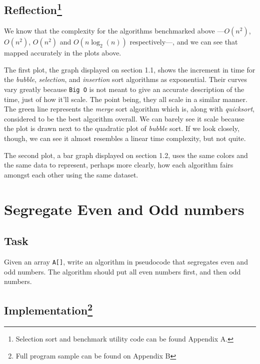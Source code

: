 \documentclass[english,a4paper,]{report}
\begin{document}
\section[Reflection]{\texorpdfstring{Reflection\footnote{Selection sort
  and benchmark utility code can be found Appendix A.}}{Reflection}}\label{reflectionlongnote}

We know that the complexity for the algorithms benchmarked above
---\(O(n^2)\), \(O(n^2)\), \(O(n^2)\) and \(O(n\log_2(n))\)
respectively---, and we can see that mapped accurately in the plots
above.

The first plot, the graph displayed on section 1.1, shows the increment
in time for the \emph{bubble}, \emph{selection}, and \emph{insertion}
sort algorithms as exponential. Their curves vary greatly because
\texttt{Big\ O} is not meant to give an accurate description of the
time, just of how it'll scale. The point being, they all scale in a
similar manner. The green line represents the \emph{merge} sort
algorithm which is, along with \emph{quicksort}, considered to be the
best algorithm overall. We can barely see it scale because the plot is
drawn next to the quadratic plot of \emph{bubble} sort. If we look
closely, though, we can see it almost resembles a linear time
complexity, but not quite.

The second plot, a bar graph displayed on section 1.2, uses the same
colors and the same data to represent, perhaps more clearly, how each
algorithm fairs amongst each other using the same dataset.

\chapter{Segregate Even and Odd
numbers}\label{segregate-even-and-odd-numbers}

\section{Task}\label{task}

Given an array \texttt{A{[}{]}}, write an algorithm in pseudocode that
segregates even and odd numbers. The algorithm should put all even
numbers first, and then odd numbers.

\section[Implementation]{\texorpdfstring{Implementation\footnote{Full
  program sample can be found on Appendix B}}{Implementation}}\label{implementation2}
\end{document}
